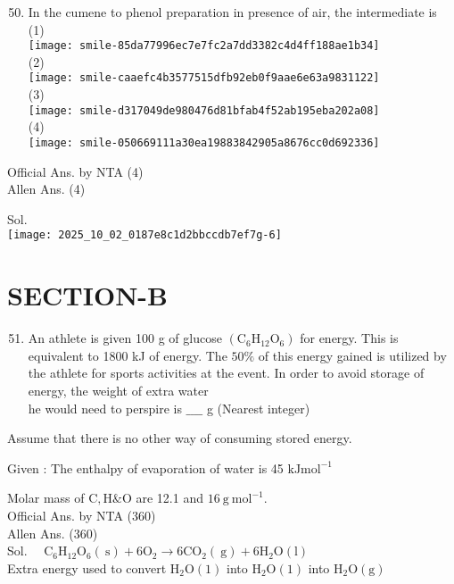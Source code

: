 \documentclass[10pt]{article}
\begin{document}
\begin{enumerate}
  \setcounter{enumi}{49}
  \item In the cumene to phenol preparation in presence of air, the intermediate is\\
(1)\\
\texttt{[image: smile-85da77996ec7e7fc2a7dd3382c4d4ff188ae1b34]}\\
(2)\\
\texttt{[image: smile-caaefc4b3577515dfb92eb0f9aae6e63a9831122]}\\
(3)\\
\texttt{[image: smile-d317049de980476d81bfab4f52ab195eba202a08]}\\
(4)\\
\texttt{[image: smile-050669111a30ea19883842905a8676cc0d692336]}
\end{enumerate}

Official Ans. by NTA (4)\\
Allen Ans. (4)

Sol.\\
\texttt{[image: 2025\_10\_02\_0187e8c1d2bbccdb7ef7g-6]}

\section*{SECTION-B}
\begin{enumerate}
  \setcounter{enumi}{50}
  \item An athlete is given 100 g of glucose \(\left(\mathrm{C}_{6} \mathrm{H}_{12} \mathrm{O}_{6}\right)\) for energy. This is equivalent to 1800 kJ of energy. The \(50 \%\) of this energy gained is utilized by the athlete for sports activities at the event. In order to avoid storage of energy, the weight of extra water\\
he would need to perspire is \(\_\_\_\_\) g (Nearest integer)
\end{enumerate}

Assume that there is no other way of consuming stored energy.

Given : The enthalpy of evaporation of water is 45 \(\mathrm{kJ} \mathrm{mol}^{-1}\)

Molar mass of \(\mathrm{C}, \mathrm{H} \& \mathrm{O}\) are 12.1 and \(16 \mathrm{~g} \mathrm{~mol}^{-1}\).\\
Official Ans. by NTA (360)\\
Allen Ans. (360)\\
Sol. \(\quad \mathrm{C}_{6} \mathrm{H}_{12} \mathrm{O}_{6}(\mathrm{~s})+6 \mathrm{O}_{2} \rightarrow 6 \mathrm{CO}_{2}(\mathrm{~g})+6 \mathrm{H}_{2} \mathrm{O}(\mathrm{l})\)\\
Extra energy used to convert \(\mathrm{H}_{2} \mathrm{O}(1)\) into \(\mathrm{H}_{2} \mathrm{O}(1)\) into \(\mathrm{H}_{2} \mathrm{O}(\mathrm{g})\)
\end{document}
